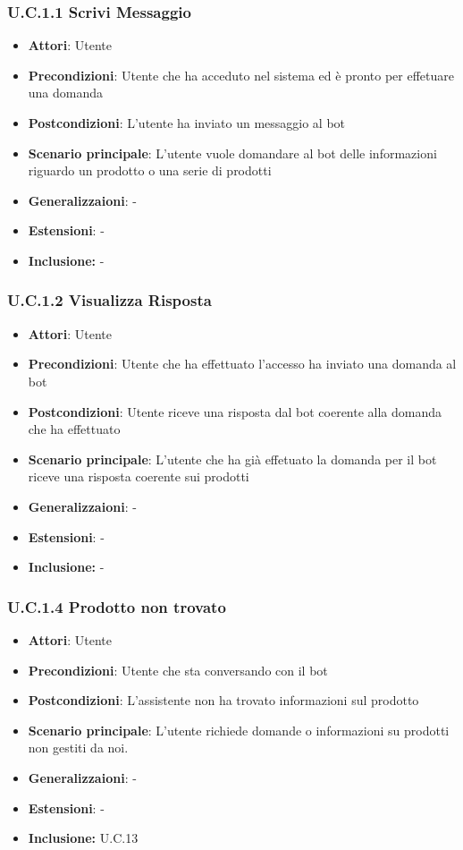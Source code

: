 \subsubsection{U.C.1.1 Scrivi Messaggio}
\begin{itemize}
    \item \textbf{Attori}: Utente
    \item \textbf{Precondizioni}: Utente che ha acceduto nel sistema ed è pronto per effetuare una domanda
    \item \textbf{Postcondizioni}: L'utente ha inviato un messaggio al bot
    \item \textbf{Scenario principale}: L’utente vuole domandare al bot delle informazioni riguardo un prodotto o una serie di prodotti
    \item \textbf{Generalizzaioni}: -
    \item \textbf{Estensioni}: -
    \item \textbf{Inclusione:} -
\end{itemize}
\subsubsection{U.C.1.2 Visualizza Risposta}
\begin{itemize}
    \item \textbf{Attori}: Utente
    \item \textbf{Precondizioni}: Utente che ha effettuato l'accesso ha inviato una domanda al bot
    \item \textbf{Postcondizioni}: Utente riceve una risposta dal bot coerente alla domanda che ha effettuato
    \item \textbf{Scenario principale}: L'utente che ha già effetuato la domanda per il bot riceve una risposta coerente sui prodotti
    \item \textbf{Generalizzaioni}: -
    \item \textbf{Estensioni}: -
    \item \textbf{Inclusione:} -
\end{itemize}
\subsubsection{U.C.1.4 Prodotto non trovato}
\begin{itemize}
    \item \textbf{Attori}: Utente
    \item \textbf{Precondizioni}: Utente che sta conversando con il bot
    \item \textbf{Postcondizioni}: L'assistente non ha trovato informazioni sul prodotto
    \item \textbf{Scenario principale}: L’utente richiede domande o informazioni su prodotti non gestiti da noi.
    \item \textbf{Generalizzaioni}: -
    \item \textbf{Estensioni}: -
    \item \textbf{Inclusione:} U.C.13
\end{itemize}
